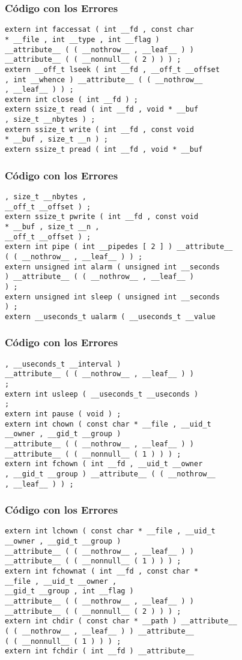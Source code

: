 \documentclass{beamer}
\begin{document}
\begin{frame}[fragile]
\frametitle{C\'odigo con los Errores}
\begin{verbatim}
extern int faccessat ( int __fd , const char 
* __file , int __type , int __flag ) 
__attribute__ ( ( __nothrow__ , __leaf__ ) ) 
__attribute__ ( ( __nonnull__ ( 2 ) ) ) ; 
extern __off_t lseek ( int __fd , __off_t __offset 
, int __whence ) __attribute__ ( ( __nothrow__ 
, __leaf__ ) ) ; 
extern int close ( int __fd ) ; 
extern ssize_t read ( int __fd , void * __buf 
, size_t __nbytes ) ; 
extern ssize_t write ( int __fd , const void 
* __buf , size_t __n ) ; 
extern ssize_t pread ( int __fd , void * __buf 
\end{verbatim}
\end{frame}
\begin{frame}[fragile]
\frametitle{C\'odigo con los Errores}
\begin{verbatim}
, size_t __nbytes , 
__off_t __offset ) ; 
extern ssize_t pwrite ( int __fd , const void 
* __buf , size_t __n , 
__off_t __offset ) ; 
extern int pipe ( int __pipedes [ 2 ] ) __attribute__ 
( ( __nothrow__ , __leaf__ ) ) ; 
extern unsigned int alarm ( unsigned int __seconds 
) __attribute__ ( ( __nothrow__ , __leaf__ ) 
) ; 
extern unsigned int sleep ( unsigned int __seconds 
) ; 
extern __useconds_t ualarm ( __useconds_t __value 
\end{verbatim}
\end{frame}
\begin{frame}[fragile]
\frametitle{C\'odigo con los Errores}
\begin{verbatim}
, __useconds_t __interval ) 
__attribute__ ( ( __nothrow__ , __leaf__ ) ) 
; 
extern int usleep ( __useconds_t __useconds ) 
; 
extern int pause ( void ) ; 
extern int chown ( const char * __file , __uid_t 
__owner , __gid_t __group ) 
__attribute__ ( ( __nothrow__ , __leaf__ ) ) 
__attribute__ ( ( __nonnull__ ( 1 ) ) ) ; 
extern int fchown ( int __fd , __uid_t __owner 
, __gid_t __group ) __attribute__ ( ( __nothrow__ 
, __leaf__ ) ) ; 
\end{verbatim}
\end{frame}
\begin{frame}[fragile]
\frametitle{C\'odigo con los Errores}
\begin{verbatim}
extern int lchown ( const char * __file , __uid_t 
__owner , __gid_t __group ) 
__attribute__ ( ( __nothrow__ , __leaf__ ) ) 
__attribute__ ( ( __nonnull__ ( 1 ) ) ) ; 
extern int fchownat ( int __fd , const char * 
__file , __uid_t __owner , 
__gid_t __group , int __flag ) 
__attribute__ ( ( __nothrow__ , __leaf__ ) ) 
__attribute__ ( ( __nonnull__ ( 2 ) ) ) ; 
extern int chdir ( const char * __path ) __attribute__ 
( ( __nothrow__ , __leaf__ ) ) __attribute__ 
( ( __nonnull__ ( 1 ) ) ) ; 
extern int fchdir ( int __fd ) __attribute__ 
\end{verbatim}
\end{frame}
\end{document}
